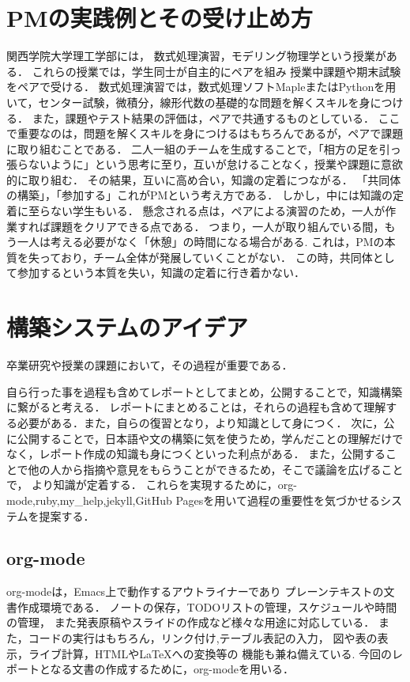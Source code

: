 \documentclass[a4,p11]{article}
\begin{document}
\section{PMの実践例とその受け止め方}
\label{sec:org2fc986b}
関西学院大学理工学部には，
数式処理演習，モデリング物理学という授業がある．
これらの授業では，学生同士が自主的にペアを組み
授業中課題や期末試験をペアで受ける．
数式処理演習では，数式処理ソフトMapleまたはPythonを用いて，センター試験，微積分，線形代数の基礎的な問題を解くスキルを身につける．
また，課題やテスト結果の評価は，ペアで共通するものとしている．
ここで重要なのは，問題を解くスキルを身につけるはもちろんであるが，ペアで課題に取り組むことである．
二人一組のチームを生成することで，「相方の足を引っ張らないように」という思考に至り，互いが怠けることなく，授業や課題に意欲的に取り組む．
その結果，互いに高め合い，知識の定着につながる．
「共同体の構築」，「参加する」これがPMという考え方である．
しかし，中には知識の定着に至らない学生もいる．
懸念される点は，ペアによる演習のため，一人が作業すれば課題をクリアできる点である．
つまり，一人が取り組んでいる間，もう一人は考える必要がなく「休憩」の時間になる場合がある.
これは，PMの本質を失っており，チーム全体が発展していくことがない．
この時，共同体として参加するという本質を失い，知識の定着に行き着かない．

\section{構築システムのアイデア}
\label{sec:orge53e136}

卒業研究や授業の課題において，その過程が重要である．

自ら行った事を過程も含めてレポートとしてまとめ，公開することで，知識構築に繋がると考える．
レポートにまとめることは，それらの過程も含めて理解する必要がある．また，自らの復習となり，より知識として身につく．
次に，公に公開することで，日本語や文の構築に気を使うため，学んだことの理解だけでなく，レポート作成の知識も身につくといった利点がある．
また，公開することで他の人から指摘や意見をもらうことができるため，そこで議論を広げることで，
より知識が定着する．
これらを実現するために，org-mode,ruby,my\_help,jekyll,GitHub Pagesを用いて過程の重要性を気づかせるシステムを提案する．
\subsection{org-mode}
\label{sec:org9918c31}
org-modeは，Emacs上で動作するアウトライナーであり
プレーンテキストの文書作成環境である．
ノートの保存，TODOリストの管理，スケジュールや時間の管理，
また発表原稿やスライドの作成など様々な用途に対応している．
また，コードの実行はもちろん，リンク付け,テーブル表記の入力，
図や表の表示，ライブ計算，HTMLや\LaTeX{}への変換等の
機能も兼ね備えている.
今回のレポートとなる文書の作成するために，org-modeを用いる．
\end{document}
